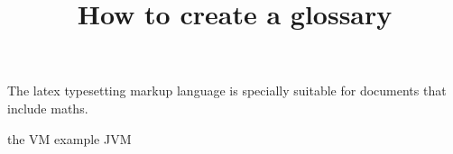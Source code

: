 \documentclass{article}
\title{How to create a glossary}
\author{ }
\date{ }
\begin{document}
\maketitle
 
The \Gls{latex} typesetting markup \gls{language} is specially \gls{suitable} 
for documents that include \gls{maths}. 

the \Gls{VM} example \gls{JVM}
 
\clearpage
 
\printglossaries
 
\end{document}
